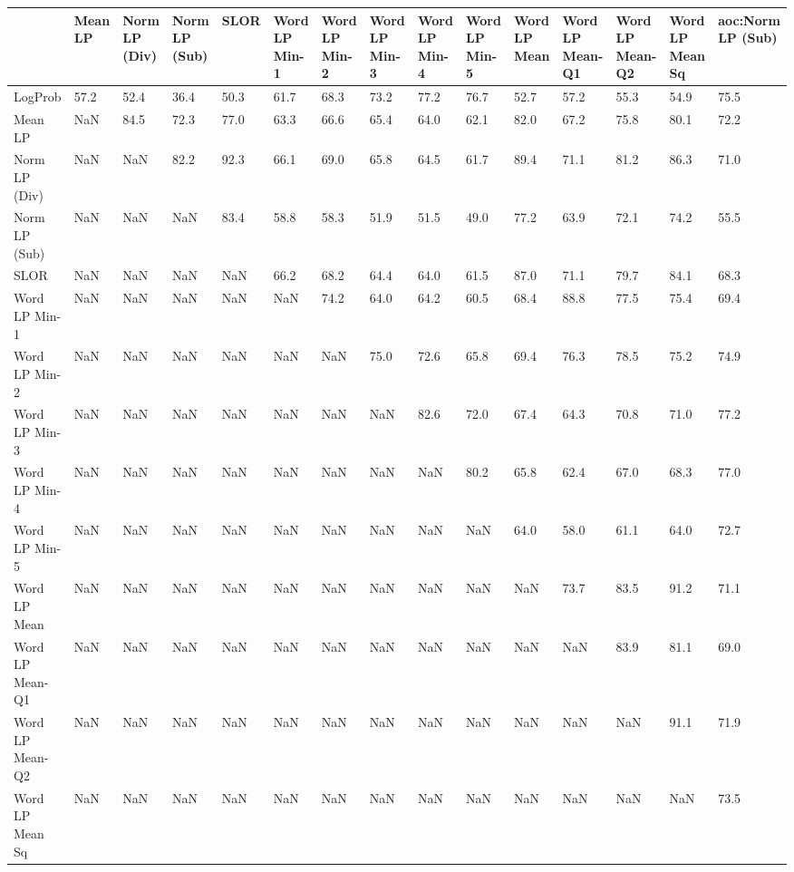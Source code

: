 \begin{tabular}{lllllllllllllll}
\toprule
 & Mean LP & Norm LP (Div) & Norm LP (Sub) & SLOR & Word LP Min-1 & Word LP Min-2 & Word LP Min-3 & Word LP Min-4 & Word LP Min-5 & Word LP Mean & Word LP Mean-Q1 & Word LP Mean-Q2 & Word LP Mean Sq & aoc:Norm LP (Sub) \\
\midrule
LogProb & 57.2 & 52.4 & 36.4 & 50.3 & 61.7 & 68.3 & 73.2 & 77.2 & 76.7 & 52.7 & 57.2 & 55.3 & 54.9 & 75.5 \\
Mean LP & NaN & 84.5 & 72.3 & 77.0 & 63.3 & 66.6 & 65.4 & 64.0 & 62.1 & 82.0 & 67.2 & 75.8 & 80.1 & 72.2 \\
Norm LP (Div) & NaN & NaN & 82.2 & 92.3 & 66.1 & 69.0 & 65.8 & 64.5 & 61.7 & 89.4 & 71.1 & 81.2 & 86.3 & 71.0 \\
Norm LP (Sub) & NaN & NaN & NaN & 83.4 & 58.8 & 58.3 & 51.9 & 51.5 & 49.0 & 77.2 & 63.9 & 72.1 & 74.2 & 55.5 \\
SLOR & NaN & NaN & NaN & NaN & 66.2 & 68.2 & 64.4 & 64.0 & 61.5 & 87.0 & 71.1 & 79.7 & 84.1 & 68.3 \\
Word LP Min-1 & NaN & NaN & NaN & NaN & NaN & 74.2 & 64.0 & 64.2 & 60.5 & 68.4 & 88.8 & 77.5 & 75.4 & 69.4 \\
Word LP Min-2 & NaN & NaN & NaN & NaN & NaN & NaN & 75.0 & 72.6 & 65.8 & 69.4 & 76.3 & 78.5 & 75.2 & 74.9 \\
Word LP Min-3 & NaN & NaN & NaN & NaN & NaN & NaN & NaN & 82.6 & 72.0 & 67.4 & 64.3 & 70.8 & 71.0 & 77.2 \\
Word LP Min-4 & NaN & NaN & NaN & NaN & NaN & NaN & NaN & NaN & 80.2 & 65.8 & 62.4 & 67.0 & 68.3 & 77.0 \\
Word LP Min-5 & NaN & NaN & NaN & NaN & NaN & NaN & NaN & NaN & NaN & 64.0 & 58.0 & 61.1 & 64.0 & 72.7 \\
Word LP Mean & NaN & NaN & NaN & NaN & NaN & NaN & NaN & NaN & NaN & NaN & 73.7 & 83.5 & 91.2 & 71.1 \\
Word LP Mean-Q1 & NaN & NaN & NaN & NaN & NaN & NaN & NaN & NaN & NaN & NaN & NaN & 83.9 & 81.1 & 69.0 \\
Word LP Mean-Q2 & NaN & NaN & NaN & NaN & NaN & NaN & NaN & NaN & NaN & NaN & NaN & NaN & 91.1 & 71.9 \\
Word LP Mean Sq & NaN & NaN & NaN & NaN & NaN & NaN & NaN & NaN & NaN & NaN & NaN & NaN & NaN & 73.5 \\
\bottomrule
\end{tabular}
